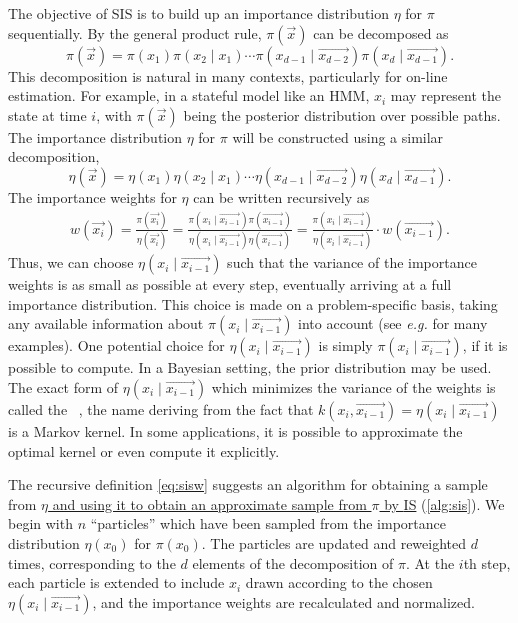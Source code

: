 The objective of \gls{SIS} is to build up an importance distribution $\eta$ for
$\pi$ sequentially. By the general product rule, $\pi(\vec{x})$ can be
decomposed as
\[
  \pi(\vec{x}) 
  = \pi(x_1) \pi(x_2 \mid x_1) \cdots
    \pi(x_{d-1} \mid \vec{x_{d-2}}) \pi(x_d \mid \vec{x_{d-1}}).
\]
This decomposition is natural in many contexts, particularly for on-line
estimation. For example, in a stateful model like an \gls{HMM}, $x_i$ may
represent the state at time $i$, with $\pi(\vec{x})$ being the posterior
distribution over possible paths. The importance distribution $\eta$ for $\pi$
will be constructed using a similar decomposition,
\[
  \eta(\vec{x}) 
  = \eta(x_1) \eta(x_2 \mid x_1) \cdots
    \eta(x_{d-1} \mid \vec{x_{d-2}}) \eta(x_d \mid \vec{x_{d-1}}).
\]
The importance weights for $\eta$ can be written recursively as
\begin{align}
  \label{eq:sisw}
  w(\vec{x_i}) = \frac{\pi(\vec{x_i})}{\eta(\vec{x_i})}
  = \frac{\pi(x_i \mid \vec{x_{i-1}})\pi(\vec{x_{i-1}})}
         {\eta(x_i \mid \vec{x_{i-1}})\eta(\vec{x_{i-1}})}
  = \frac{\pi(x_i \mid \vec{x_{i-1}})}
         {\eta(x_i \mid \vec{x_{i-1}})}\cdot w(\vec{x_{i-1}}).
\end{align}
Thus, we can choose $\eta(x_i \mid \vec{x_{i-1}})$ such that the variance of
the importance weights is as small as possible at every step, eventually
arriving at a full importance distribution. This choice is made on a
problem-specific basis, taking any available information about $\pi(x_i \mid
\vec{x_{i-1}})$ into account (see \textit{e.g.}
\autocite{smith2013sequential,liu2008monte} for many examples).  One potential
choice for $\eta(x_i \mid \vec{x_{i-1}})$ is simply $\pi(x_i \mid
\vec{x_{i-1}})$, if it is possible to compute. In a Bayesian setting, the
prior distribution may be used. The exact form of $\eta(x_i \mid
\vec{x_{i-1}})$ which minimizes the variance of the weights is called the
~\autocite{cappe2007overview}, the name deriving from the
fact that $k(x_i, \vec{x_{i-1}}) = \eta(x_i \mid \vec{x_{i-1}})$ is a Markov
kernel. In some applications, it is possible to approximate the optimal kernel
or even compute it explicitly.

The recursive definition \ref{eq:sisw} suggests an algorithm for obtaining a
sample from {\color{blue}\uline{$\eta$ and using it to obtain an approximate
sample from $\pi$ by \gls{IS}}} (\cref{alg:sis}).  We begin with $n$
``particles'' which have been sampled from the importance distribution
$\eta(x_0)$ for $\pi(x_0)$. The particles are updated and reweighted $d$ times,
corresponding to the $d$ elements of the decomposition of $\pi$. At the $i$th
step, each particle is extended to include $x_i$ drawn according to the chosen
$\eta(x_i \mid \vec{x_{i-1}})$, and the importance weights are recalculated and
normalized. 

